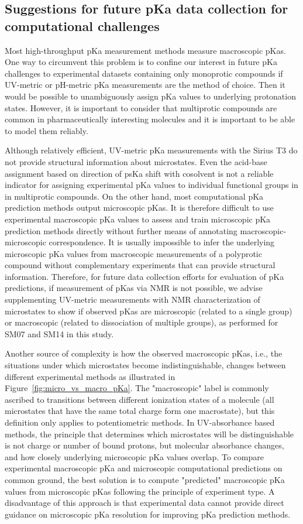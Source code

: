 \documentclass[9pt,lineno]{elife}
\begin{document}
\subsection{Suggestions for future pKa data collection for computational challenges}

Most high-throughput pKa measurement methods measure macroscopic pKas. 
One way to circumvent this problem is to confine our interest in future pKa challenges to experimental datasets containing only monoprotic compounds if UV-metric or pH-metric pKa measurements are the method of choice. 
Then it would be possible to unambiguously assign pKa values to underlying protonation states. 
However, it is important to consider that multiprotic compounds are common in pharmaceutically interesting molecules and it is important to be able to model them reliably.

Although relatively efficient, UV-metric pKa measurements with the Sirius T3 do not provide structural information about microstates. 
Even the acid-base assignment based on direction of psKa shift with cosolvent is not a reliable indicator for assigning experimental pKa values to individual functional groups in in multiprotic compounds. 
On the other hand, most computational pKa prediction methods output microscopic pKas. 
It is therefore difficult to use experimental macroscopic pKa values to assess and train microscopic pKa prediction methods directly without further means of annotating macroscopic-microscopic correspondence. 
It is usually impossible to infer the underlying microscopic pKa values from macroscopic measurements of a polyprotic compound without complementary experiments that can provide structural information. Therefore, for future data collection efforts for evaluation of pKa predictions, if measurement of pKas via NMR is not possible, we advise supplementing UV-metric measurements with NMR characterization of microstates to show if observed pKas are microscopic (related to a single group) or macroscopic (related to dissociation of multiple groups), as performed for SM07 and SM14 in this study.

Another source of complexity is how the observed macroscopic pKas, i.e., the situations under which microstates become indistinguishable, changes between different experimental methods as illustrated in Figure~\ref{fig:micro_vs_macro_pKa}. 
The "macroscopic" label is commonly ascribed to transitions between different ionization states of a molecule (all microstates that have the same total charge form one macrostate), but this definition only applies to potentiometric methods. 
In UV-absorbance based methods, the principle that determines which microstates will be distinguishable is not charge or number of bound protons, but molecular absorbance changes, and how closely underlying microscopic pKa values overlap. 
To compare experimental macroscopic pKa and microscopic computational predictions on common ground, the best solution is to compute "predicted" macroscopic pKa values from microscopic pKas following the principle of experiment type. 
A disadvantage of this approach is that experimental data cannot provide direct guidance on microscopic pKa resolution for improving pKa prediction methods.
\end{document}
